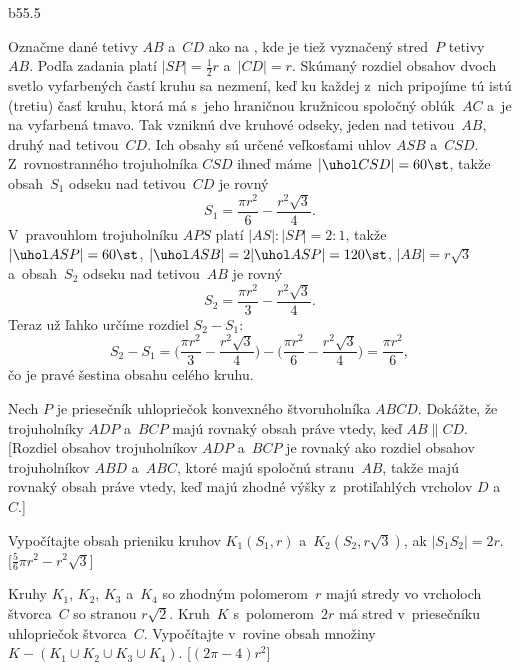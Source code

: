 {%
\epsplace b55.5 \hfil\Obr

Označme dané tetivy $AB$ a~$CD$ ako na \obr, kde je tiež
vyznačený stred~$P$ tetivy~$AB$. Podľa zadania platí
\inspicture{}
$|SP|=\frac12r$ a~$|CD|=r$. Skúmaný rozdiel obsahov dvoch svetlo
vyfarbených častí kruhu sa nezmení, keď ku každej z~nich
pripojíme tú istú (tretiu) časť kruhu, ktorá má s~jeho hraničnou
kružnicou spoločný oblúk~$AC$ a~je na  vyfarbená tmavo. Tak
vzniknú dve kruhové odseky, jeden nad tetivou~$AB$, druhý nad
tetivou~$CD$. Ich obsahy sú určené veľkosťami uhlov $ASB$
a~$CSD$. Z~rovnostranného trojuholníka $CSD$ ihneď máme $|\uhol
CSD|=60\st$, takže obsah~$S_1$ odseku nad tetivou~$CD$ je rovný
$$
S_1=\frac{\pi r^2}{6}-\frac{r^2\sqrt3}{4}.
$$
V~pravouhlom trojuholníku $APS$ platí $|AS|:|SP|=2:1$, takže
$|\uhol ASP|=60\st$, $|\uhol ASB|=2|\uhol ASP|=120\st$,
$|AB|=r\sqrt3$ 
a~obsah~$S_2$ odseku nad tetivou~$AB$ je rovný
$$
S_2=\frac{\pi r^2}{3}-\frac{r^2\sqrt3}{4}.
$$
Teraz už ľahko určíme rozdiel $S_2-S_1$:
$$
S_2-S_1=\biggl(\frac{\pi r^2}{3}-\frac{r^2\sqrt3}{4}\biggr)-
\biggl(\frac{\pi r^2}{6}-\frac{r^2\sqrt3}{4}\biggr)=
\frac{\pi r^2}{6},
$$
čo je pravé šestina obsahu celého kruhu.

Nech $P$ je priesečník uhlopriečok konvexného štvoruholníka $ABCD$.
Dokážte, že trojuholníky $ADP$ a~$BCP$ majú rovnaký obsah práve vtedy, keď
$AB\parallel CD$. [Rozdiel obsahov trojuholníkov $ADP$ a~$BCP$ je rovnaký
ako rozdiel obsahov trojuholníkov $ABD$ a~$ABC$, ktoré majú spoločnú
stranu~$AB$, takže majú rovnaký obsah práve vtedy, keď majú zhodné
výšky z~protiľahlých vrcholov $D$ a~$C$.]

Vypočítajte obsah prieniku kruhov $K_1(S_1,r)$ a~$K_2(S_2,r\sqrt3)$,
ak $|S_1S_2|=2r$. [$\frac56\pi r^2-r^2\sqrt3$]

Kruhy $K_1$, $K_2$, $K_3$ a~$K_4$ so zhodným polomerom~$r$ majú
stredy vo vrcholoch štvorca~$C$ so stranou $r\sqrt2$. Kruh~$K$
s~polomerom~$2r$ má stred v~priesečníku uhlopriečok štvorca~$C$.
Vypočítajte v~rovine obsah množiny $K-(K_1\cup K_2\cup K_3\cup
K_4)$. [$(2\pi-4)r^2$]
}

